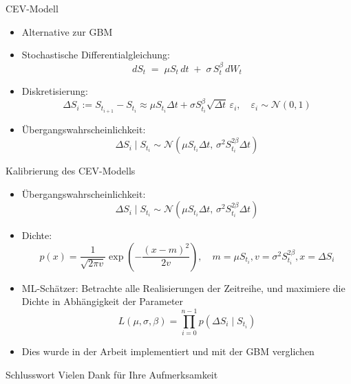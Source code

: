 \documentclass{beamer}
\begin{document}
\begin{frame}{CEV-Modell}
  \begin{itemize}
    \item Alternative zur GBM
    \item Stochastische Differentialgleichung: $$dS_t \;=\; \mu S_t\,dt \;+\; \sigma\,S_t^{\beta}\,dW_t$$
    \item Diskretisierung: $$\Delta S_i := S_{t_{i+1}} - S_{t_i} \approx \mu S_{t_i}\Delta t + \sigma S_{t_i}^{\beta}\sqrt{\Delta t}\,\varepsilon_i,\quad \varepsilon_i\sim\mathcal N(0,1)$$
    \item Übergangswahrscheinlichkeit: $$\Delta S_i \mid S_{t_i} \sim \mathcal N\left(\mu S_{t_i} \Delta t,\, \sigma^2 S_{t_i}^{2\beta} \Delta t\right)$$
  \end{itemize}
\end{frame}

\begin{frame}{Kalibrierung des CEV-Modells}
  \begin{itemize}
    \item Übergangswahrscheinlichkeit: $$\Delta S_i \mid S_{t_i} \sim \mathcal N\left(\mu S_{t_i} \Delta t,\, \sigma^2 S_{t_i}^{2\beta} \Delta t\right)$$
    \item Dichte: $$p(x) = \frac{1}{\sqrt{2\pi v}} \exp\left(-\frac{(x-m)^2}{2v}\right),\quad m = \mu S_{t_i}, v = \sigma^2 S_{t_i}^{2 \beta}, x=\Delta S_i$$
    \item ML-Schätzer: Betrachte alle Realisierungen der Zeitreihe, und maximiere die Dichte in Abhängigkeit der Parameter
  $$L(\mu, \sigma, \beta) = \prod_{i=0}^{n-1} p(\Delta S_i \mid S_{t_i})$$
    \item Dies wurde in der Arbeit implementiert und mit der GBM verglichen
  \end{itemize}
\end{frame}

\begin{frame}{Schlusswort}
  \centering
  \Huge Vielen Dank für Ihre Aufmerksamkeit\\
\end{frame}
\end{document}
